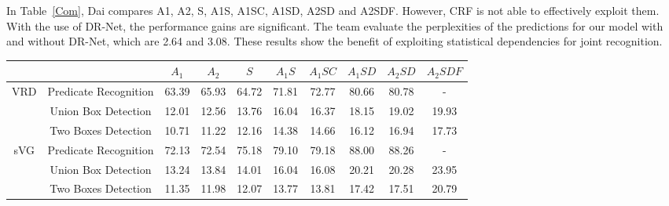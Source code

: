 \documentclass[10pt,twocolumn,letterpaper]{article}
\begin{document}
In Table~\ref{Com}, Dai compares A1, A2, S, A1S, A1SC, A1SD, A2SD and A2SDF. However, CRF is not able to effectively exploit them. With the use of DR-Net, the performance gains are significant. The team evaluate the perplexities of the predictions for our model with and without DR-Net, which are 2.64 and 3.08. These results show the benefit of exploiting statistical dependencies for joint recognition.

\begin{table*}[tp]
	\label{tb1}
	\begin{tabular}{|c|c|c|c|c|c|c|c|c|c|}
		   &  & $A_1$ & $A_2$ & $S$  & $A_1S$ & $A_1SC$ & $A_1SD$ & $A_2SD$ & $A_2SDF$ \\
		   \hline
		\multirow{3}{*}{VRD}& Predicate Recognition & 63.39 & 65.93 & 64.72  & 71.81 & 72.77 & 80.66 & 80.78 & - \\
		& Union Box Detection & 12.01 & 12.56 & 13.76  & 16.04 & 16.37 & 18.15 & 19.02 & 19.93 \\
		& Two Boxes Detection & 10.71 & 11.22 & 12.16  & 14.38 & 14.66 & 16.12 & 16.94 & 17.73 \\
		\hline\hline
		\multirow{3}{*}{sVG}& Predicate Recognition & 72.13 & 72.54 & 75.18  & 79.10 & 79.18 & 88.00 & 88.26 & - \\
		& Union Box Detection & 13.24 & 13.84 & 14.01  & 16.04 & 16.08 & 20.21 & 20.28 & 23.95 \\
		& Two Boxes Detection & 11.35 & 11.98 & 12.07  & 13.77 & 13.81 & 17.42 & 17.51 & 20.79 \\	
	\end{tabular}
	\caption{Comparison of different variants of the proposed method, using \emph{Recall}@50 as the metric.} \label{Com}
\end{table*}

{\small


}
\end{document}
